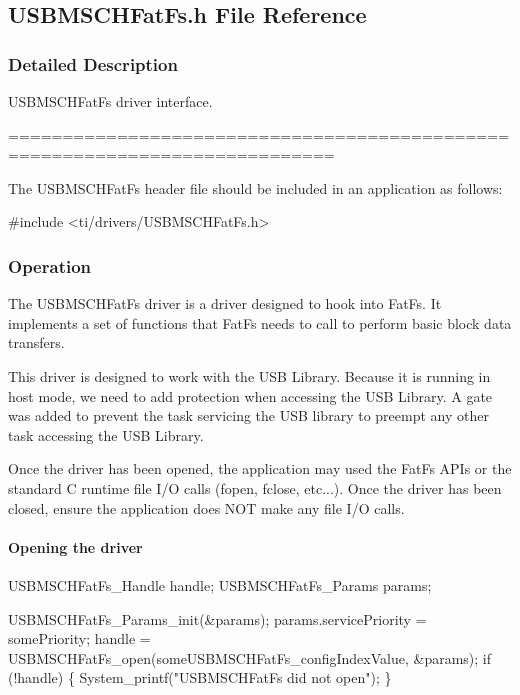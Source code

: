 \subsection{U\+S\+B\+M\+S\+C\+H\+Fat\+Fs.\+h File Reference}
\label{_u_s_b_m_s_c_h_fat_fs_8h}


\subsubsection{Detailed Description}
U\+S\+B\+M\+S\+C\+H\+Fat\+Fs driver interface. 

============================================================================

The U\+S\+B\+M\+S\+C\+H\+Fat\+Fs header file should be included in an application as follows\+: 
\begin{DoxyCode}
\textcolor{preprocessor}{#include <ti/drivers/USBMSCHFatFs.h>}
\end{DoxyCode}


\subsubsection*{Operation}

The U\+S\+B\+M\+S\+C\+H\+Fat\+Fs driver is a driver designed to hook into Fat\+Fs. It implements a set of functions that Fat\+Fs needs to call to perform basic block data transfers.

This driver is designed to work with the U\+S\+B Library. Because it is running in host mode, we need to add protection when accessing the U\+S\+B Library. A gate was added to prevent the task servicing the U\+S\+B library to preempt any other task accessing the U\+S\+B Library.

Once the driver has been opened, the application may used the Fat\+Fs A\+P\+Is or the standard C runtime file I/\+O calls (fopen, fclose, etc...). Once the driver has been closed, ensure the application does N\+O\+T make any file I/\+O calls.

\paragraph*{Opening the driver}


\begin{DoxyCode}
USBMSCHFatFs_Handle      handle;
USBMSCHFatFs_Params      params;

USBMSCHFatFs_Params_init(&params);
params.servicePriority  = somePriority;
handle = USBMSCHFatFs_open(someUSBMSCHFatFs\_configIndexValue, &params);
\textcolor{keywordflow}{if} (!handle) \{
    System\_printf(\textcolor{stringliteral}{"USBMSCHFatFs did not open"});
\}
\end{DoxyCode}


